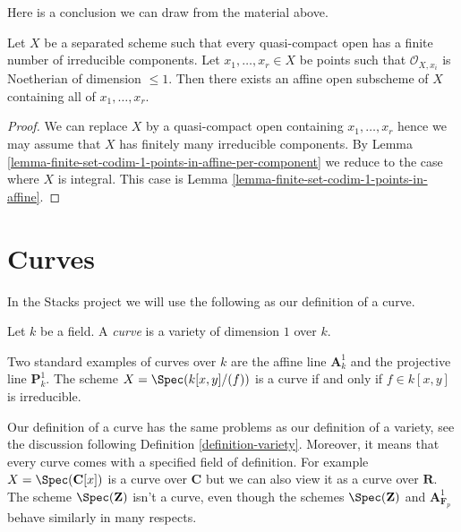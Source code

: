 \noindent
Here is a conclusion we can draw from the material above.

\begin{proposition}
\label{proposition-finite-set-of-points-of-codim-1-in-affine}
Let $X$ be a separated scheme such that every quasi-compact open
has a finite number of irreducible components. Let $x_1, \ldots, x_r \in X$
be points such that $\mathcal{O}_{X, x_i}$ is Noetherian
of dimension $\leq 1$. Then there exists an affine open subscheme
of $X$ containing all of $x_1, \ldots, x_r$.
\end{proposition}

\begin{proof}
We can replace $X$ by a quasi-compact open containing $x_1, \ldots, x_r$
hence we may assume that $X$ has finitely many irreducible components.
By Lemma \ref{lemma-finite-set-codim-1-points-in-affine-per-component}
we reduce to the case where $X$ is integral. This case is
Lemma \ref{lemma-finite-set-codim-1-points-in-affine}.
\end{proof}





\section{Curves}
\label{section-curves}

\noindent
In the Stacks project we will use the following as our definition
of a curve.

\begin{definition}
\label{definition-curve}
Let $k$ be a field. A {\it curve} is a variety of dimension $1$ over $k$.
\end{definition}

\noindent
Two standard examples of curves over $k$ are the affine line $\mathbf{A}^1_k$
and the projective line $\mathbf{P}^1_k$. The scheme $X = \Spec(k[x, y]/(f))$
is a curve if and only if $f \in k[x, y]$ is irreducible.

\medskip\noindent
Our definition of a curve has the same problems as our definition of a
variety, see the discussion following Definition \ref{definition-variety}.
Moreover, it means that every curve comes with a specified field of definition.
For example $X = \Spec(\mathbf{C}[x])$ is a curve over $\mathbf{C}$
but we can also view it as a curve over $\mathbf{R}$. The scheme
$\Spec(\mathbf{Z})$ isn't a curve, even though the schemes $\Spec(\mathbf{Z})$
and $\mathbf{A}^1_{\mathbf{F}_p}$ behave similarly in many respects.

